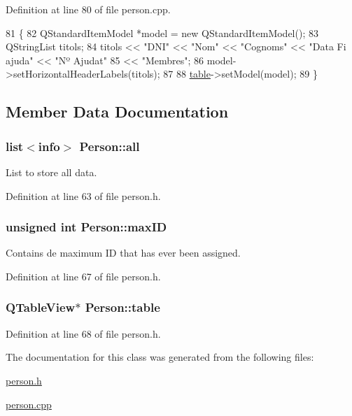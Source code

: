 Definition at line 80 of file person.\+cpp.


\begin{DoxyCode}
81 \{
82     QStandardItemModel *model = \textcolor{keyword}{new} QStandardItemModel();
83     QStringList titols;
84     titols << \textcolor{stringliteral}{"DNI"} << \textcolor{stringliteral}{"Nom"} << \textcolor{stringliteral}{"Cognoms"} << \textcolor{stringliteral}{"Data Fi ajuda"} << \textcolor{stringliteral}{"Nº Ajudat"}
85            << \textcolor{stringliteral}{"Membres"};
86     model->setHorizontalHeaderLabels(titols);
87     
88     \hyperlink{class_person_aefba04c96d0d90ab2b220e6ad704c55a}{table}->setModel(model);
89 \}
\end{DoxyCode}


\subsection{Member Data Documentation}
\hypertarget{class_person_a23d6ff8cb8e45c9e3502baffa6a0468a}{
\subsubsection[{all}]{\setlength{\rightskip}{0pt plus 5cm}list$<${\bf info}$>$ Person\+::all\hspace{0.3cm}{\ttfamily [private]}}}\label{class_person_a23d6ff8cb8e45c9e3502baffa6a0468a}


List to store all data. 



Definition at line 63 of file person.\+h.

\hypertarget{class_person_a816ee6194426eb703b61ae267e8e8ee6}{
\subsubsection[{max\+I\+D}]{\setlength{\rightskip}{0pt plus 5cm}unsigned int Person\+::max\+I\+D\hspace{0.3cm}{\ttfamily [private]}}}\label{class_person_a816ee6194426eb703b61ae267e8e8ee6}


Contains de maximum I\+D that has ever been assigned. 



Definition at line 67 of file person.\+h.

\hypertarget{class_person_aefba04c96d0d90ab2b220e6ad704c55a}{
\subsubsection[{table}]{\setlength{\rightskip}{0pt plus 5cm}Q\+Table\+View$\ast$ Person\+::table\hspace{0.3cm}{\ttfamily [private]}}}\label{class_person_aefba04c96d0d90ab2b220e6ad704c55a}


Definition at line 68 of file person.\+h.



The documentation for this class was generated from the following files\+:\begin{DoxyCompactItemize}
\item 
\hyperlink{person_8h}{person.\+h}\item 
\hyperlink{person_8cpp}{person.\+cpp}\end{DoxyCompactItemize}
